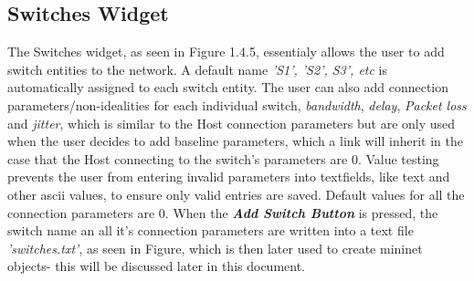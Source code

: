 \subsection{Switches Widget}
The Switches widget, as seen in Figure 1.4.5, essentialy allows the user to add switch entities to the network. A default name \textit{'S1', 'S2', S3', etc} is automatically assigned to each switch entity. The user can also add connection parameters/non-idealities for each individual switch, \textit{bandwidth}, \textit{delay}, \textit{Packet loss} and \textit{jitter}, which is similar to the Host connection parameters but are only used when the user decides to add baseline parameters, which a link will inherit in the case that the Host connecting to the switch's parameters are 0. Value testing prevents the user from entering invalid parameters into textfields, like text and other ascii values, to ensure only valid entries are saved. Default values for all the connection parameters are 0. When the \textbf{\textit{Add Switch Button}} is pressed, the switch name an all it's connection parameters are written into a text file \textit{'switches.txt'}, as seen in Figure, which is then later used to create mininet objects- this will be discussed later in this document.\\
